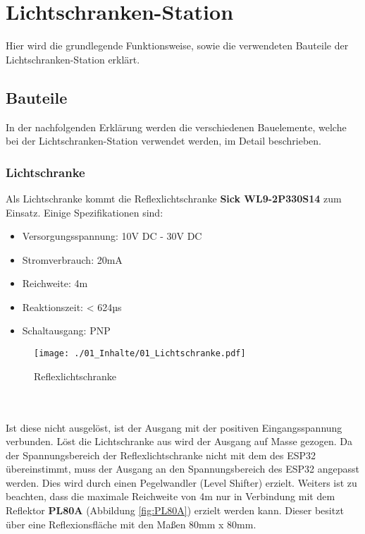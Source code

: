 
\section{Lichtschranken-Station}
Hier wird die grundlegende Funktionsweise, sowie die verwendeten Bauteile der Lichtschranken-Station erklärt.

\subsection{Bauteile}
In der nachfolgenden Erklärung werden die verschiedenen Bauelemente, welche bei der Lichtschranken-Station verwendet werden, im Detail beschrieben.

\subsubsection{Lichtschranke}
\label{sec:Lichtschranke}
Als Lichtschranke kommt die Reflexlichtschranke \textbf{Sick WL9-2P330S14 }zum Einsatz. Einige Spezifikationen sind:

\begin{minipage}{0.6\textwidth}
	\begin{itemize}
		\item Versorgungsspannung: 10V DC - 30V DC
		\item Stromverbrauch: 20mA
		\item Reichweite: 4m
		\item Reaktionszeit: < 624µs
		\item Schaltausgang: PNP
	\end{itemize}
\end{minipage}%
\begin{minipage}{0.4\textwidth}		
	\begin{figure}[H]
		\texttt{[image: ./01\_Inhalte/01\_Lichtschranke.pdf]}	
		\centering
		\caption{Reflexlichtschranke}
		\label{fig:Lichtschranke}
	\end{figure}
\end{minipage}	
\\ \\
Ist diese nicht ausgelöst, ist der Ausgang mit der positiven Eingangsspannung verbunden. Löst die Lichtschranke aus wird der Ausgang auf Masse gezogen. Da der Spannungsbereich der Reflexlichtschranke nicht mit dem des ESP32 übereinstimmt, muss der Ausgang an den Spannungsbereich des ESP32 angepasst werden. Dies wird durch einen Pegelwandler (Level Shifter) erzielt. Weiters ist zu beachten, dass die maximale Reichweite von 4m nur in Verbindung mit dem Reflektor \textbf{PL80A} (Abbildung \ref{fig:PL80A}) erzielt werden kann. Dieser besitzt über eine Reflexionsfläche mit den Maßen 80mm x 80mm.

